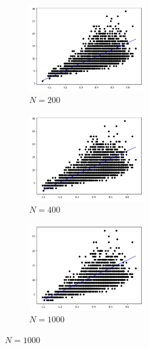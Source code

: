 \documentclass[12pt,letterpaper]{article}
\begin{document}
\begin{enumerate}[leftmargin=!,labelindent=5pt]
\begin{figure}[H]
        \begin{subfigure}{0.3\textwidth}
        \includegraphics[width=5cm]{images/M200.jpg} 
        \caption{$N = 200$}
        \label{fig:subim4}
        \end{subfigure}
        \begin{subfigure}{0.3\textwidth}
        \includegraphics[width=5cm]{images/M400.jpg}
        \caption{$N = 400$}
        \label{fig:subim5}
        \end{subfigure}
        \begin{subfigure}{0.3\textwidth}
        \includegraphics[width=5cm]{images/M1000.jpg}
        \caption{$N = 1000$}
        \label{fig:subim6}
        \end{subfigure}
        

\end{figure}
\end{enumerate}
\end{document}
